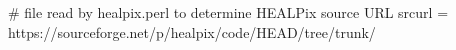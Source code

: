 # file read by healpix.perl to determine HEALPix source URL
srcurl = https://sourceforge.net/p/healpix/code/HEAD/tree/trunk/






